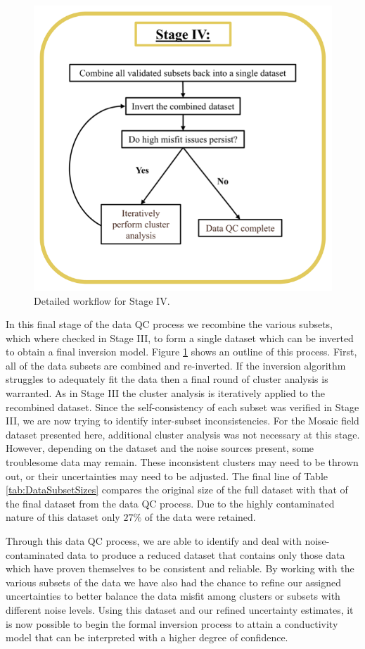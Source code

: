 \documentclass[final,authoryear,5p,times,twocolumn]{elsarticle}
\begin{document}
\begin{figure} [!ht]
\begin{center}
   \includegraphics[trim=0cm 0cm 0cm 0cm, clip=true,width=0.75\linewidth]{./Figures/Fig16.png}
\end{center}
\caption{Detailed workflow for Stage IV.}
\label{fig:DataQC_workflow_StageIV}
\end{figure}

In this final stage of the data QC process we recombine the various subsets, which where checked in Stage III, to form a single dataset which can be inverted to obtain a final inversion model. Figure \ref{fig:DataQC_workflow_StageIV} shows an outline of this process. First, all of the data subsets are combined and re-inverted. If the inversion algorithm struggles to adequately fit the data then a final round of cluster analysis is warranted. As in Stage III the cluster analysis is iteratively applied to the recombined dataset. Since the self-consistency of each subset was verified in Stage III, we are now trying to identify inter-subset inconsistencies. For the Mosaic field dataset presented here, additional cluster analysis was not necessary at this stage. However, depending on the dataset and the noise sources present, some troublesome data may remain. These inconsistent clusters may need to be thrown out, or their uncertainties may need to be adjusted. The final line of Table \ref{tab:DataSubsetSizes} compares the original size of the full dataset with that of the final dataset from the data QC process. Due to the highly contaminated nature of this dataset only $27\%$ of the data were retained.

Through this data QC process, we are able to identify and deal with noise-contaminated data to produce a reduced dataset that contains only those data which have proven themselves to be consistent and reliable. By working with the various subsets of the data we have also had the chance to refine our assigned uncertainties to better balance the data misfit among clusters or subsets with different noise levels. Using this dataset and our refined uncertainty estimates, it is now possible to begin the formal inversion process to attain a conductivity model that can be interpreted with a higher degree of confidence.
\end{document}
